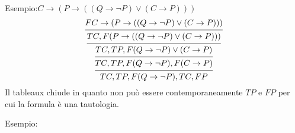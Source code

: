 Esempio:$C \rightarrow (P \rightarrow ((Q \rightarrow \neg P) \lor (C \rightarrow P)))$
\begin{equation*}
\begin{prooftree}
\hypo{F C \rightarrow (P \rightarrow ((Q \rightarrow \neg P) \lor (C \rightarrow P)))}
\infer1 {TC,F (P \rightarrow ((Q \rightarrow \neg P) \lor (C \rightarrow P)))}
\infer1 {TC,TP,F (Q \rightarrow \neg P) \lor (C \rightarrow P)}
\infer1 {TC,TP,F (Q \rightarrow \neg P),F (C \rightarrow P)}
\infer1{TC,TP,F (Q \rightarrow \neg P),TC,FP}
\end{prooftree}
\end{equation*}
Il tableaux chiude in quanto non può essere contemporaneamente $TP$ e $FP$ per cui
la formula è una tautologia.

Esempio:




